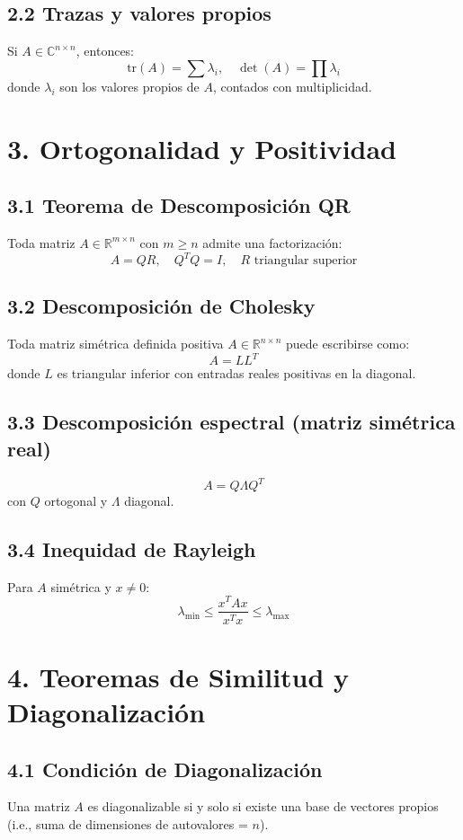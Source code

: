 \documentclass{article}
\begin{document}
\subsection*{2.2 Trazas y valores propios}
Si \( A \in \mathbb{C}^{n \times n} \), entonces:
\[
\text{tr}(A) = \sum \lambda_i, \quad \det(A) = \prod \lambda_i
\]
donde \(\lambda_i\) son los valores propios de \(A\), contados con multiplicidad.

\section*{3. Ortogonalidad y Positividad}

\subsection*{3.1 Teorema de Descomposición QR}
Toda matriz \( A \in \mathbb{R}^{m \times n} \) con \(m \geq n\) admite una factorización:
\[
A = QR, \quad Q^T Q = I, \quad R \text{ triangular superior}
\]

\subsection*{3.2 Descomposición de Cholesky}
Toda matriz simétrica definida positiva \(A \in \mathbb{R}^{n \times n}\) puede escribirse como:
\[
A = LL^T
\]
donde \(L\) es triangular inferior con entradas reales positivas en la diagonal.

\subsection*{3.3 Descomposición espectral (matriz simétrica real)}
\[
A = Q \Lambda Q^T
\]
con \(Q\) ortogonal y \(\Lambda\) diagonal.

\subsection*{3.4 Inequidad de Rayleigh}
Para \(A\) simétrica y \(x \neq 0\):
\[
\lambda_{\min} \leq \frac{x^T A x}{x^T x} \leq \lambda_{\max}
\]

\section*{4. Teoremas de Similitud y Diagonalización}

\subsection*{4.1 Condición de Diagonalización}
Una matriz \(A\) es diagonalizable si y solo si existe una base de vectores propios (i.e., suma de dimensiones de autovalores = \(n\)).
\end{document}
